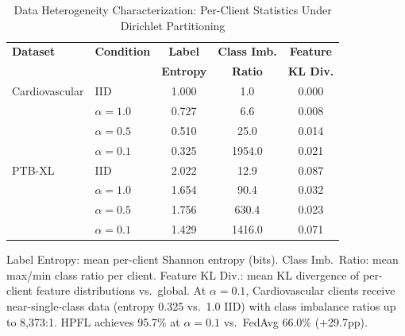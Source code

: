 \documentclass[conference]{IEEEtran}
\begin{document}
\begin{table}[htbp]
\centering
\caption{Data Heterogeneity Characterization: Per-Client Statistics Under Dirichlet Partitioning}
\label{tab:heterogeneity_cascade3}
\small
\begin{tabular}{llccc}
\toprule
\textbf{Dataset} & \textbf{Condition} & \textbf{Label} & \textbf{Class Imb.} & \textbf{Feature} \\
 & & \textbf{Entropy} & \textbf{Ratio} & \textbf{KL Div.} \\
\midrule
Cardiovascular & IID & 1.000 & 1.0 & 0.000 \\
 & $\alpha{=}1.0$ & 0.727 & 6.6 & 0.008 \\
 & $\alpha{=}0.5$ & 0.510 & 25.0 & 0.014 \\
 & $\alpha{=}0.1$ & 0.325 & 1954.0 & 0.021 \\
\midrule
PTB-XL & IID & 2.022 & 12.9 & 0.087 \\
 & $\alpha{=}1.0$ & 1.654 & 90.4 & 0.032 \\
 & $\alpha{=}0.5$ & 1.756 & 630.4 & 0.023 \\
 & $\alpha{=}0.1$ & 1.429 & 1416.0 & 0.071 \\
\bottomrule
\end{tabular}

\vspace{1mm}
\footnotesize{Label Entropy: mean per-client Shannon entropy (bits). Class Imb.\ Ratio: mean max/min class ratio per client. Feature KL Div.: mean KL divergence of per-client feature distributions vs.\ global. At $\alpha{=}0.1$, Cardiovascular clients receive near-single-class data (entropy 0.325 vs.\ 1.0 IID) with class imbalance ratios up to 8,373:1. HPFL achieves 95.7\% at $\alpha{=}0.1$ vs.\ FedAvg 66.0\% (+29.7pp).}
\end{table}
\end{document}
